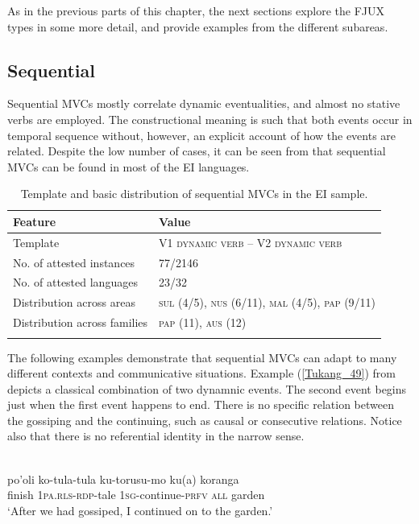 As in the previous parts of this chapter, the next sections explore the FJUX types in some more detail, and provide examples from the different subareas.

\subsection{Sequential}

Sequential MVCs mostly correlate dynamic eventualities, and almost no stative verbs are employed. The constructional meaning is such that both events occur in temporal sequence without, however, an explicit account of how the events are related. Despite the low number of cases, it can be seen from  that sequential MVCs can be found in most of the EI languages.

\begin{table}
\begin{tabular}{ll}
\lsptoprule
Feature&Value\tabularnewline
\midrule
Template& V1 \textsc{dynamic verb} -- V2 \textsc{dynamic verb}\tabularnewline
No. of attested instances& 77/2146 \tabularnewline
No. of attested languages& 23/32 \tabularnewline
Distribution across areas& \textsc{sul} (4/5), \textsc{nus} (6/11), \textsc{mal} (4/5), \textsc{pap} (9/11) \tabularnewline
Distribution across families& \textsc{pap} (11), \textsc{aus} (12) \tabularnewline
\lspbottomrule
\end{tabular}
\caption[Template and basic distribution of sequential MVCs]{Template and basic distribution of sequential MVCs in the EI sample.}
\label{table:sequential}
\end{table}

The following examples demonstrate that sequential MVCs can adapt to many different contexts and communicative situations. Example (\ref{Tukang_49}) from  depicts a classical combination of two dynamnic events. The second event begins just when the first event happens to end. There is no specific relation between the gossiping and the continuing, such as causal or consecutive relations. Notice also that there is no referential identity in the narrow sense. 

\ea \label{Tukang_49}
\\
\gll po'oli ko-tula-tula ku-torusu-mo ku(a) koranga \\
finish 1\textsc{pa}.\textsc{rls}-\textsc{rdp}-tale 1\textsc{sg}-continue-\textsc{prfv} \textsc{all} garden \\
\glft `After we had gossiped, I continued on to the garden.'\\ 
\z

